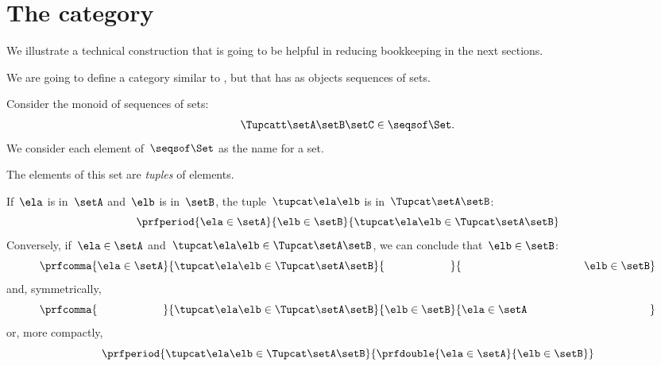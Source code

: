 \section{The \SetL category}
\label{sec:SetL}

We illustrate a technical construction that is going to be helpful in reducing bookkeeping in the next sections.

We are going to define a category similar to \Set, but that has as objects sequences of sets.

Consider the monoid of sequences of sets:
%
\begin{equation}
	\label{eq:sets-monoid}
	\Tupcatt \setA  \setB  \setC \in \seqsof\Set.
\end{equation}
%
We consider each element of~$\seqsof\Set$ as the name for a set.

The elements of this set are \emph{tuples} of elements.

If~$\ela$ is in~$\setA$ and~$\elb$ is in~$\setB$, the tuple~$\tupcat \ela \elb$ is in~$\Tupcat \setA \setB$:
%
\begin{equation}
	\label{eq:sets-monoid-axiom1}
	\prfperiod{
		\ela \in \setA
	}{
		\elb \in \setB
	}{
		\tupcat \ela \elb \in \Tupcat \setA \setB
	}
\end{equation}
%
Conversely, if~$\ela \in \setA$ and~$\tupcat \ela \elb \in \Tupcat \setA \setB$, we can conclude that~$\elb \in \setB$:
%
\begin{equation}
	\label{eq:sets-monoid-axiom2}
	\prfcomma{
		\ela \in \setA
	}{
		\tupcat \ela \elb \in \Tupcat \setA  \setB
	}{
		\phantom{\elb \in \setB}
	}{
		\rule{39mm}{0pt} \elb \in  \setB
	}
\end{equation}
%
and, symmetrically,
%
\begin{equation}
	\label{eq:sets-monoid-axiom3}
	\prfcomma{
		\phantom{\ela \in \setA}
	}{
		\tupcat \ela \elb \in \Tupcat \setA \setB
	}{
		\elb \in \setB
	}{
		\ela \in  \setA \rule{39mm}{0pt}
	}
\end{equation}
%
or, more compactly,
%
\begin{equation}
	\label{eq:sets-monoid-axiom3bis}
	\prfperiod{
		\tupcat \ela \elb \in \Tupcat \setA \setB
	}{
		\prfdouble{
			\ela \in \setA
		}{
			\elb \in \setB
		}
	}
\end{equation}
%


